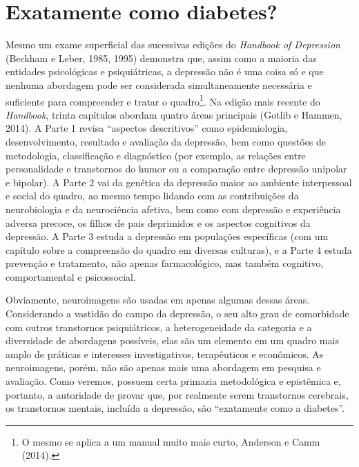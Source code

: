 \chapter{Exatamente como diabetes?}

Mesmo um exame superficial das sucessivas edições do \emph{Handbook of
Depression} (Beckham e Leber, 1985, 1995) demonstra que, assim como a
maioria das entidades psicológicas e psiquiátricas, a depressão não é
uma coisa só e que nenhuma abordagem pode ser considerada
simultaneamente necessária e suficiente para compreender e tratar o
quadro\footnote[3]{O mesmo se aplica a um manual muito mais curto, Anderson e Camm
(2014).}. Na edição mais recente do \emph{Handbook},
trinta capítulos abordam quatro áreas principais (Gotlib e Hammen,
2014). A Parte 1 revisa ``aspectos descritivos'' como epidemiologia,
desenvolvimento, resultado e avaliação da depressão, bem como questões
de metodologia, classificação e diagnóstico (por exemplo, as relações
entre personalidade e transtornos do humor ou a comparação entre
depressão unipolar e bipolar). A Parte 2 vai da genética da depressão
maior ao ambiente interpessoal e social do quadro, ao mesmo tempo
lidando com as contribuições da neurobiologia e da neurociência afetiva,
bem como com depressão e experiência adversa precoce, os filhos de pais
deprimidos e os aspectos cognitivos da depressão. A Parte 3 estuda a
depressão em populações específicas (com um capítulo sobre a compreensão
do quadro em diversas culturas), e a Parte 4 estuda prevenção e
tratamento, não apenas farmacológico, mas também cognitivo,
comportamental e psicossocial.

Obviamente, neuroimagens são usadas em apenas algumas dessas áreas.
Considerando a vastidão do campo da depressão, o seu alto grau de
comorbidade com outros transtornos psiquiátricos, a heterogeneidade da
categoria e a diversidade de abordagens possíveis, elas são um elemento
em um quadro mais amplo de práticas e interesses investigativos,
terapêuticos e econômicos. As neuroimagens, porém, não são apenas mais
uma abordagem em pesquisa e avaliação. Como veremos, possuem certa
primazia metodológica e epistêmica e, portanto, a autoridade de provar
que, por realmente serem transtornos cerebrais, os transtornos mentais,
incluída a depressão, são ``exatamente como a diabetes''.

